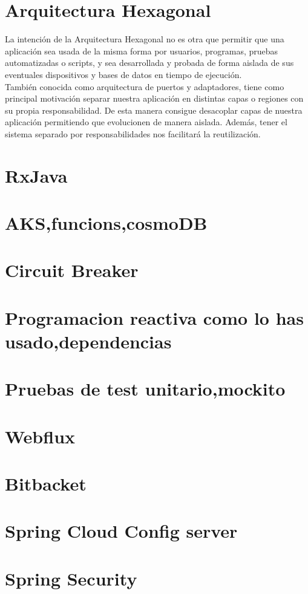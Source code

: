   \section{ Arquitectura  Hexagonal}
    La intenci\'on de la Arquitectura Hexagonal no es otra que permitir que una aplicaci\'on sea usada de la 
    misma forma por usuarios, programas, pruebas automatizadas o scripts, y sea desarrollada y probada de
     forma aislada de sus eventuales dispositivos y bases de datos en tiempo de ejecuci\'on.\\
      Tambi\'en conocida como arquitectura de puertos y adaptadores, tiene como principal motivaci\'on separar
       nuestra aplicaci\'on en distintas capas o regiones con su propia responsabilidad. De esta manera consigue
        desacoplar capas de nuestra aplicaci\'on permitiendo que evolucionen de manera aislada. Adem\'as, tener 
        el sistema separado por responsabilidades nos facilitar\'a la reutilizaci\'on.
\section{RxJava}
\section{AKS,funcions,cosmoDB}
\section{Circuit Breaker}
\section{Programacion reactiva como lo has usado,dependencias}

\section{Pruebas de test unitario,mockito}
\section{Webflux}
\section{Bitbacket}
\section{Spring Cloud Config server}
\section{Spring Security}
